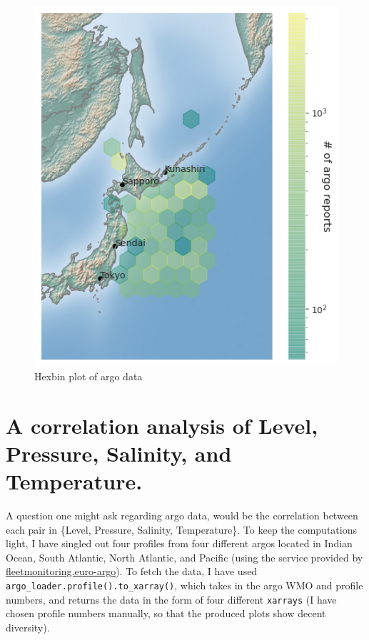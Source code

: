 \documentclass[12pt]{article}
\begin{document}
\begin{figure}[!h]
\centering
\includegraphics[scale=0.9]{hexbin_argos_locations.png}
\caption{Hexbin plot of argo data}
\label{hexbin}
\end{figure}

\section{A correlation analysis of Level, Pressure, Salinity, 
and Temperature.}

A question one might ask regarding argo data, would be the correlation 
between each pair in \{Level, 
Pressure, Salinity, Temperature\}. To keep the computations light, 
I have singled out four profiles from four different
argos located in Indian Ocean, South Atlantic, North Atlantic, and 
Pacific (using the service provided by 
\href{https://fleetmonitoring.euro-argo.eu/dashboard?Status=Active}{fleetmonitoring.euro-argo}). 
To fetch  
the data, I have used \verb|argo_loader.profile().to_xarray()|, which 
takes in the argo WMO and profile numbers, and returns the data
in the form of four different \verb|xarrays| (I have chosen profile 
numbers 
manually, so that the produced plots show decent diversity).\\
\end{document}
